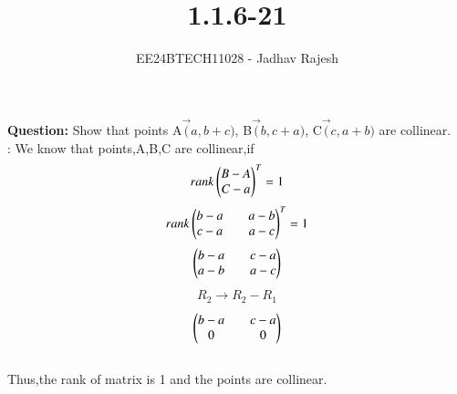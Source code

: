 \documentclass[journal]{IEEEtran}
\begin{document}

\vspace{3cm}
\title{1.1.6-21}
\author{EE24BTECH11028 - Jadhav Rajesh}
{\let\newpage\relax\maketitle}

\renewcommand{\thefigure}{\theenumi}
\renewcommand{\thetable}{\theenumi}
\setlength{\intextsep}{10pt} %


\renewcommand{\thetable}{\theenumi}
 \textbf{Question:} Show that points A$\vec(a,b+c)$, B$\vec(b,c+a)$, C$\vec(c,a+b)$ are collinear.\\
 \solution : We know that points,A,B,C are collinear,if\\
 \begin{align}
     rank \begin{pmatrix}
                  B-A\\
                  C-a\end{pmatrix}^{T}=1
 \end{align}
 \begin{align}
                rank\begin{pmatrix}
                        b-a && a-b\\
                        c-a && a-c
                \end{pmatrix}^{T}=1
 \end{align}
 \begin{align}
               \begin{pmatrix}
                      b-a && c-a\\
                      a-b && a-c
               \end{pmatrix}
 \end{align}
 \begin{align}
               R_{2}\rightarrow{{R_{2}-R_{1}}}
 \end{align}
 \begin{align}
              \begin{pmatrix}
                      b-a && c-a\\
                       0   &&  0
              \end{pmatrix}
 \end{align}\\
             Thus,the rank of matrix is 1 and the points are collinear.\\
             
\end{document}
